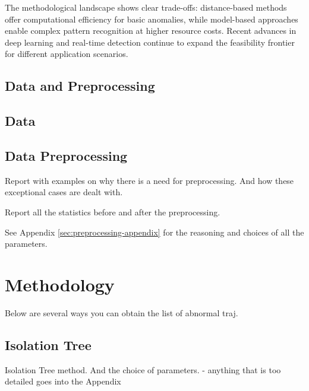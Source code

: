 \documentclass[runningheads]{llncs}
\begin{document}
The methodological landscape shows clear trade-offs: distance-based methods offer computational efficiency for basic anomalies, while model-based approaches enable complex pattern recognition at higher resource costs. Recent advances in deep learning \cite{LI2024111387} and real-time detection \cite{hu2024realtime} continue to expand the feasibility frontier for different application scenarios.


\subsection{Data and Preprocessing}
\label{sec:data-preprocessing}

\subsection{Data}

\subsection{Data Preprocessing}
\label{sec:preprocessing}

Report with examples on why there is a need for preprocessing. And how these exceptional cases are dealt with. 



Report all the statistics before and after the preprocessing. 


See Appendix \ref{sec:preprocessing-appendix} for the reasoning and choices of all the parameters. 


\section{Methodology}
\label{sec:methodology}

Below are several ways you can obtain the list of abnormal traj.

\subsection{Isolation Tree}
\label{sec:iso}
Isolation Tree method. And the choice of parameters. - anything that is too detailed goes into the Appendix
\end{document}
